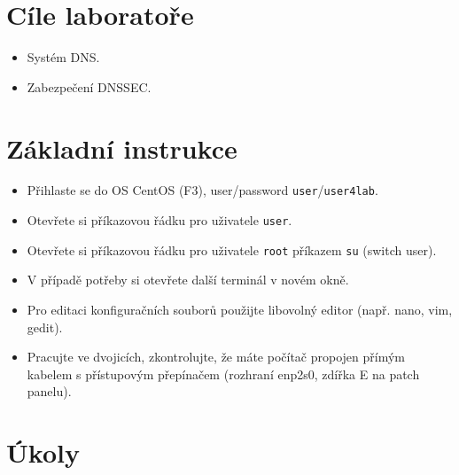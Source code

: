 
\section*{Cíle laboratoře}
\begin{itemize}
  \item Systém DNS.
  \item Zabezpečení DNSSEC.
\end{itemize}

\section*{Základní instrukce}
\begin{itemize}
  \item Přihlaste se do OS CentOS (F3), user/password {\tt user}/{\tt user4lab}.
  \item Otevřete si příkazovou řádku pro uživatele {\tt user}.
  \item Otevřete si příkazovou řádku pro uživatele {\tt root} příkazem {\tt su}
    (switch user).
  \item V případě potřeby si otevřete další terminál v novém okně.
  \item Pro editaci konfiguračních souborů použijte libovolný editor (např.
    nano, vim, gedit).
  \item Pracujte ve dvojicích, zkontrolujte, že máte počítač propojen
    přímým kabelem s přístupovým přepínačem (rozhraní enp2s0, zdířka E na patch panelu).
\end{itemize}

\section*{Úkoly}
